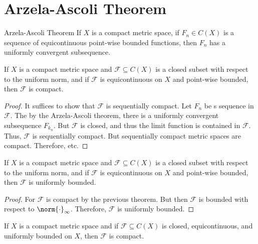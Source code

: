 \documentclass[crop=false,class=article,oneside]{standalone}
\begin{document}
    \section{Arzela-Ascoli Theorem}
        \begin{ltheorem}{Arzela-Ascoli Theorem}
            If $X$ is a compact metric space, if
            $F_{n}\in{C}(X)$ is a sequence of equicontinuous
            point-wise bounded functions, then $F_{n}$ has a
            uniformly convergent subsequence.
        \end{ltheorem}
        \begin{theorem}
            If $X$ is a compact metric space and
            $\mathscr{F}\subseteq{C}(X)$ is a closed subset with
            respect to the uniform norm, and if
            $\mathscr{F}$ is equicontinuous on $X$ and point-wise
            bounded, then $\mathscr{F}$ is compact.
        \end{theorem}
        \begin{proof}
            It suffices to show that $\mathscr{F}$ is sequentially
            compact. Let $F_{n}$ be s sequence in $\mathscr{F}$.
            The by the Arzela-Ascoli theorem, there is a uniformly
            convergent subsequence $F_{k_{n}}$. But $\mathscr{F}$
            is closed, and thus the limit function is contained
            in $\mathscr{F}$. Thus, $\mathscr{F}$ is sequentially
            compact. But sequentially compact metric spaces are
            compact. Therefore, etc.
        \end{proof}
        \begin{theorem}
            If $X$ is a compact metric space and
            $\mathscr{F}\subseteq{C}(X)$ is a closed subset with
            respect to the uniform norm, and if
            $\mathscr{F}$ is equicontinuous on $X$ and point-wise
            bounded, then $\mathscr{F}$ is uniformly bounded.
        \end{theorem}
        \begin{proof}
            For $\mathscr{F}$ is compact by the previous theorem.
            But then $\mathscr{F}$ is bounded with respect to
            $\norm{\cdot}_{\infty}$. Therefore, $\mathscr{F}$ is
            uniformly bounded.
        \end{proof}
        \begin{theorem}
            If $X$ is a compact metric space and if
            $\mathscr{F}\subseteq{C}(X)$ is closed, equicontinuous,
            and uniformly bounded on $X$, then $\mathscr{F}$ is
            compact.
        \end{theorem}
\end{document}
